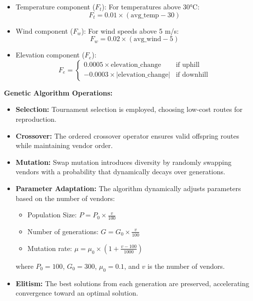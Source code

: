 \begin{itemize}
    \item Temperature component ($F_t$): For temperatures above 30°C:
          \begin{equation}
              F_t = 0.01 \times (\text{avg\_temp} - 30)
          \end{equation}

    \item Wind component ($F_w$): For wind speeds above 5 m/s:
          \begin{equation}
              F_w = 0.02 \times (\text{avg\_wind} - 5)
          \end{equation}

    \item Elevation component ($F_e$):
          \begin{equation}
              F_e =
              \begin{cases}
                  0.0005 \times \text{elevation\_change}    & \text{if uphill}   \\
                  -0.0003 \times |\text{elevation\_change}| & \text{if downhill}
              \end{cases}
          \end{equation}
\end{itemize}

\textbf{Genetic Algorithm Operations:}
\begin{itemize}
    \item \textbf{Selection:} Tournament selection is employed, choosing low-cost routes for reproduction.
    \item \textbf{Crossover:} The ordered crossover operator ensures valid offspring routes while maintaining vendor order.
    \item \textbf{Mutation:} Swap mutation introduces diversity by randomly swapping vendors with a probability that dynamically decays over generations.
    \item \textbf{Parameter Adaptation:} The algorithm dynamically adjusts parameters based on the number of vendors:
          \begin{itemize}
              \item Population Size: $P = P_0 \times \frac{v}{100}$
              \item Number of generations: $G = G_0 \times \frac{v}{100}$
              \item Mutation rate: $\mu = \mu_0 \times \left(1 + \frac{v - 100}{1000}\right)$
          \end{itemize}
          where $P_0=100$, $G_0=300$, $\mu_0=0.1$, and $v$ is the number of vendors.
    \item \textbf{Elitism:} The best solutions from each generation are preserved, accelerating convergence toward an optimal solution.
\end{itemize}

